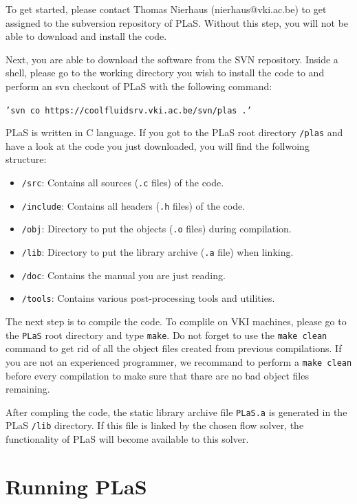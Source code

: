 \documentclass[12pt]{article}
\begin{document}
To get started, please contact Thomas Nierhaus (nierhaus@vki.ac.be) to get assigned to the subversion repository of PLaS. Without this step, you will not be able to download and install the code.

Next, you are able to download the software from the SVN repository. Inside a shell, please go to the working directory you wish to install the code to and perform an svn checkout of PLaS with the following command:

{\tt{'svn co https://coolfluidsrv.vki.ac.be/svn/plas .'}}

PLaS is written in C language. If you got to the PLaS root directory {\tt{/plas}} and have a look at the code you just downloaded, you will find the follwoing structure:

\begin{itemize}
\item {\tt{/src}}: Contains all sources ({\tt{.c}} files) of the code.
\item {\tt{/include}}: Contains all headers ({\tt{.h}} files) of the code.
\item {\tt{/obj}}: Directory to put the objects ({\tt{.o}} files) during compilation.
\item {\tt{/lib}}: Directory to put the library archive ({\tt{.a}} file) when linking.
\item {\tt{/doc}}: Contains the manual you are just reading.
\item {\tt{/tools}}: Contains various post-processing tools and utilities.
\end{itemize}

The next step is to compile the code. To complile on VKI machines, please go to the {\tt{PLaS}} root directory and type {\tt{make}}. Do not forget to use the {\tt{make clean}} command to get rid of all the object files created from previous compilations. If you are not an experienced programmer, we recommand to perform a {\tt{make clean}} before every compilation to make sure that thare are no bad object files remaining.

After compling the code, the static library archive file {\tt{PLaS.a}} is generated in the PLaS {\tt{/lib}}
 directory. If this file is linked by the chosen flow solver, the functionality of PLaS will become available to this solver.

\newpage
\section{Running PLaS}
\label{sec:run}
\end{document}
